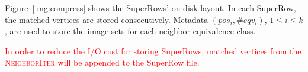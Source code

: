 Figure~\ref{img:compress} shows the SuperRows' on-disk layout.
In each SuperRow, the matched vertices are stored consecutively.
Metadata $(pos_i, \#eqv_i)$, $ 1 \le i \le k$, are used to store the image sets for each neighbor equivalence class.

\textcolor{red}{In order to reduce the I/O cost for storing SuperRows, matched vertices from the \textsc{NeighborIter} will be appended to the SuperRow file.}



